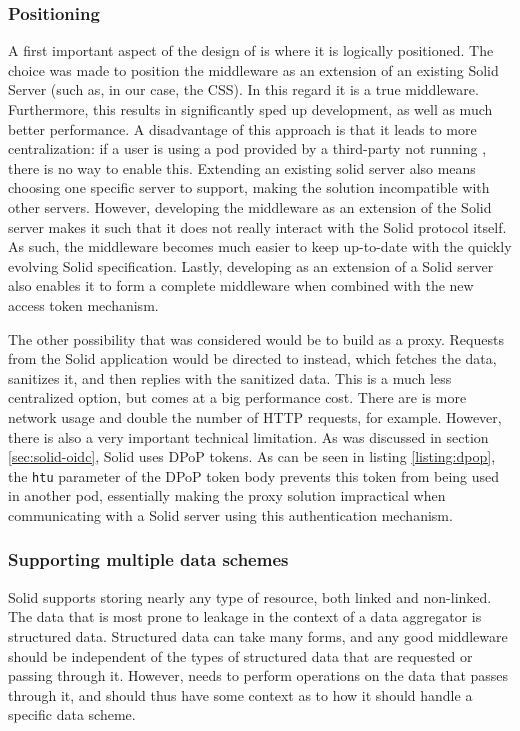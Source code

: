 \subsubsection{Positioning}
A first important aspect of the design of \middleware{} is where it is logically positioned. The choice was made to position the middleware as an extension of an existing Solid Server (such as, in our case, the \gls{CSS}). In this regard it is a true middleware. Furthermore, this results in significantly sped up development, as well as much better performance. A disadvantage of this approach is that it leads to more centralization: if a user is using a pod provided by a third-party not running \middleware{}, there is no way to enable this. Extending an existing solid server also means choosing one specific server to support, making the solution incompatible with other servers. However, developing the middleware as an extension of the Solid server makes it such that it does not really interact with the Solid protocol itself. As such, the middleware becomes much easier to keep up-to-date with the quickly evolving Solid specification. Lastly, developing \middleware{} as an extension of a Solid server also enables it to form a complete middleware when combined with the new access token mechanism.

The other possibility that was considered would be to build \middleware{} as a proxy. Requests from the Solid application would be directed to \middleware{} instead, which fetches the data, sanitizes it, and then replies with the sanitized data. This is a much less centralized option, but comes at a big performance cost. There are is more network usage and double the number of HTTP requests, for example. However, there is also a very important technical limitation. As was discussed in section \ref{sec:solid-oidc}, Solid uses \gls{DPoP} tokens. As can be seen in listing \ref{listing:dpop}, the \texttt{htu} parameter of the \gls{DPoP} token body prevents this token from being used in another pod, essentially making the proxy solution impractical when communicating with a Solid server using this authentication mechanism.


\subsubsection{Supporting multiple data schemes}
Solid supports storing nearly any type of resource, both linked and non-linked. The data that is most prone to leakage in the context of a data aggregator is structured data. Structured data can take many forms, and any good middleware should be independent of the types of structured data that are requested or passing through it. However, \middleware{} needs to perform operations on the data that passes through it, and should thus have some context as to how it should handle a specific data scheme.

